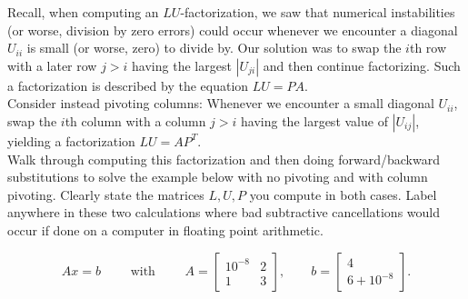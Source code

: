 \documentclass[11pt]{article}
\newenvironment{problem}[2][Question]{\begin{trivlist}
\item[\hskip \labelsep {\bfseries #1}\hskip \labelsep {\bfseries #2.}]}{\end{trivlist}}
\theoremstyle{definition}
\begin{document}
\begin{problem}{2}
Recall, when computing an $LU$-factorization, we saw that numerical instabilities (or worse, division by zero errors) could occur whenever we encounter a diagonal $U_{ii}$ is small (or worse, zero) to divide by. Our solution was to swap the $i$th row with a later row $j>i$ having the largest $|U_{ji}|$ and then continue factorizing. Such a factorization is described by the equation $LU = PA$.\\

\noindent Consider instead pivoting columns: Whenever we encounter a small diagonal $U_{ii}$, swap the $i$th column with a column $j>i$ having the largest value of $|U_{ij}|$, yielding a factorization $LU = AP^T$.\\

    Walk through computing this factorization and then doing forward/backward substitutions to solve the example below with no pivoting and with column pivoting.
    Clearly state the matrices $L,U,P$ you compute in both cases.
    Label anywhere in these two calculations where bad subtractive cancellations would occur if done on a computer in floating point arithmetic.
    
    $$ Ax=b \qquad \text{ with } \qquad A = \begin{bmatrix}
        10^{-8} & 2 \\
        1 & 3
    \end{bmatrix},\qquad b = \begin{bmatrix} 4 \\ 6+10^{-8} \end{bmatrix}.
    $$
\end{problem}
\end{document}
